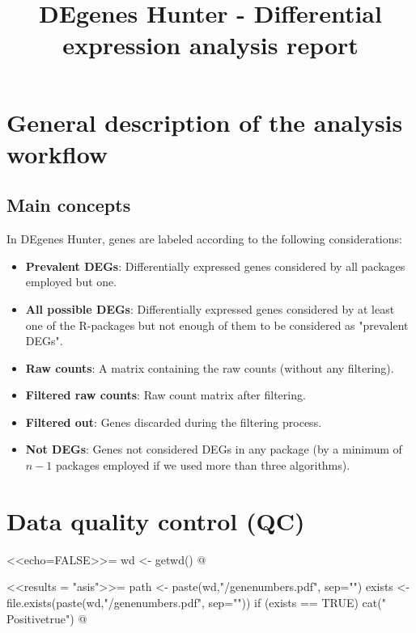 \documentclass{article}
\begin{document}
\title{DEgenes Hunter - Differential expression analysis report}
	\maketitle


\section{General description of the analysis workflow}



\subsection{Main concepts}

In DEgenes Hunter, genes are labeled according to the following considerations:
\begin{itemize}
       \item {\bf Prevalent DEGs}: Differentially expressed genes considered by all packages employed but one.
       \item {\bf All possible DEGs}: Differentially expressed genes considered by at least one of the R-packages but not enough of them to be considered as "prevalent DEGs".
       \item {\bf Raw counts}: A matrix containing the raw counts (without any filtering).
       \item {\bf Filtered raw counts}: Raw count matrix after filtering.
       \item {\bf Filtered out}: Genes discarded during the filtering process.
       \item {\bf Not DEGs}: Genes not considered DEGs in any package (by a minimum of $n-1$ packages employed if we used more than three algorithms).
\end{itemize}


\section{Data quality control (QC)}


<<echo=FALSE>>=
wd <- getwd()
@


\newif\ifPositive

<<results = "asis">>=
path <- paste(wd,"/genenumbers.pdf", sep="")
exists <- file.exists(paste(wd,"/genenumbers.pdf", sep=""))
if (exists == TRUE) {
  cat("\\Positivetrue")
}
@

\ifPositive
  \begin{center}
    \texttt{[image: \\Sexpr\{path]}}
  \end{center}
\fi
\end{document}

